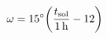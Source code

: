 \documentclass[border=3pt]{standalone}
\begin{document}
\pagecolor{bg}\color{fg}
$\displaystyle\omega=15^{\circ}\!\left(\frac{t_{\rm sol}}{1\,\mathrm{h}}-12\right)$
\end{document}

